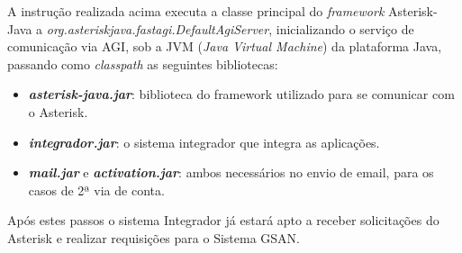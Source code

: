 A instrução realizada acima executa a classe principal do \textit{framework} Asterisk-Java a \textit{ org.asteriskjava.fastagi.DefaultAgiServer}, inicializando o serviço de comunicação via AGI, sob a JVM (\textit{Java Virtual Machine}) da plataforma Java, passando como \textit{classpath} as seguintes bibliotecas: 

\begin{itemize}
	\item \textbf{\textit{asterisk-java.jar}}: biblioteca do framework utilizado para se comunicar com o Asterisk.
	\item \textbf{\textit{integrador.jar}}: o sistema integrador que integra as aplicações.
	\item \textbf{\textit{mail.jar}} e \textbf{\textit{activation.jar}}: ambos necessários no envio de email, para os casos de 2ª via de conta.	
\end{itemize}

Após estes passos o sistema Integrador já estará apto a receber solicitações do Asterisk e realizar requisições para o Sistema GSAN.